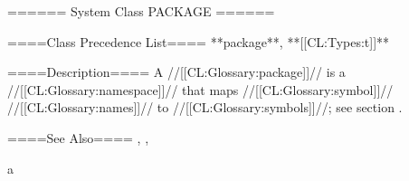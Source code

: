 ====== System Class PACKAGE ======

====Class Precedence List==== 
**package**, **[[CL:Types:t]]**

====Description====
A //[[CL:Glossary:package]]// is a //[[CL:Glossary:namespace]]// that maps //[[CL:Glossary:symbol]]// //[[CL:Glossary:names]]// to //[[CL:Glossary:symbols]]//; see section {\secref\PackageConcepts}.

====See Also====
{\secref\PackageConcepts}, {\secref\PrintingOtherObjects}, {\secref\SymbolTokens}

a